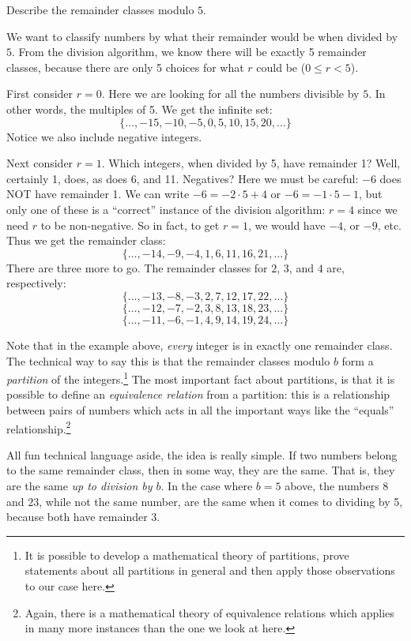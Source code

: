 \documentclass[12pt]{article}
\begin{document}
\begin{example}
	Describe the remainder classes modulo $5$.
	
	\begin{solution}
		We want to classify numbers by what their remainder would be when divided by $5$.  From the division algorithm, we know there will be exactly 5 remainder classes, because there are only 5 choices for what $r$ could be ($0 \le r < 5$).
		
		First consider $r = 0$.  Here we are looking for all the numbers divisible by $5$.  In other words, the multiples of 5.  We get the infinite set:
		\[\{\ldots, -15, -10, -5, 0, 5, 10, 15, 20, \ldots\}\]
		Notice we also include negative integers.
		
		Next consider $r = 1$.  Which integers, when divided by 5, have remainder 1?  Well, certainly 1, does, as does 6, and 11.  Negatives?  Here we must be careful: $-6$ does NOT have remainder 1.  We can write $-6 = -2\cdot 5 + 4$ or $-6 = -1 \cdot 5 - 1$, but only one of these is a ``correct'' instance of the division algorithm: $r = 4$ since we need $r$ to be non-negative.  So in fact, to get $r = 1$, we would have $-4$, or $-9$, etc.  Thus we get the remainder class:
		\[\{\ldots, -14, -9, -4, 1, 6, 11, 16, 21, \ldots\}\]
		There are three more to go.  The remainder classes for $2$, $3$, and $4$ are, respectively:
		\[\{\ldots, -13, -8, -3, 2, 7, 12, 17, 22,\ldots\}\]
		\[\{\ldots, -12, -7, -2, 3, 8, 13, 18, 23, \ldots\}\]
		\[\{\ldots, -11, -6, -1, 4, 9, 14, 19, 24, \ldots\}\]
	\end{solution}
\end{example}

Note that in the example above, {\em every} integer is in exactly one remainder class.  The technical way to say this is that the remainder classes modulo $b$ form a {\em partition} of the integers.\footnote{It is possible to develop a mathematical theory of partitions, prove statements about all partitions in general and then apply those observations to our case here.} The most important fact about partitions, is that it is possible to define an {\em equivalence relation} from a partition: this is a relationship between pairs of numbers which acts in all the important ways like the ``equals'' relationship.\footnote{Again, there is a mathematical theory of equivalence relations which applies in many more instances than the one we look at here.}

All fun technical language aside, the idea is really simple. If two numbers belong to the same remainder class, then in some way, they are the same.  That is, they are the same {\em up to division by $b$}.  In the case where $b = 5$ above, the numbers $8$ and $23$, while not the same number, are the same when it comes to dividing by 5, because both have remainder $3$.  
\end{document}
